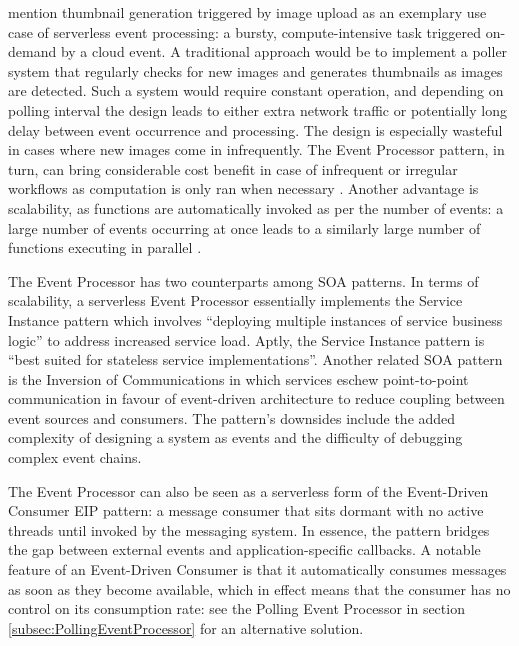 \textcite{baldini17currentTrends} mention thumbnail generation triggered by image upload as an exemplary use case of serverless event processing: a bursty, compute-intensive task triggered on-demand by a cloud event. A traditional approach would be to implement a poller system that regularly checks for new images and generates thumbnails as images are detected. Such a system would require constant operation, and depending on polling interval the design leads to either extra network traffic or potentially long delay between event occurrence and processing. The design is especially wasteful in cases where new images come in infrequently. The Event Processor pattern, in turn, can bring considerable cost benefit in case of infrequent or irregular workflows as computation is only ran when necessary \parencite{hong18securingviaserverlesspatterns}. Another advantage is scalability, as functions are automatically invoked as per the number of events: a large number of events occurring at once leads to a similarly large number of functions executing in parallel \parencite{hong18securingviaserverlesspatterns}.

The Event Processor has two counterparts among SOA patterns. In terms of scalability, a serverless Event Processor essentially implements the Service Instance pattern which involves ``deploying multiple instances of service business logic'' to address increased service load. Aptly, the Service Instance pattern is ``best suited for stateless service implementations''. Another related SOA pattern is the Inversion of Communications in which services eschew point-to-point communication in favour of event-driven architecture to reduce coupling between event sources and consumers. The pattern's downsides include the added complexity of designing a system as events and the difficulty of debugging complex event chains. \parencite{rotem12soa}

The Event Processor can also be seen as a serverless form of the Event-Driven Consumer EIP pattern: a message consumer that sits dormant with no active threads until invoked by the messaging system. In essence, the pattern bridges the gap between external events and application-specific callbacks. A notable feature of an Event-Driven Consumer is that it automatically consumes messages as soon as they become available, which in effect means that the consumer has no control on its consumption rate: see the Polling Event Processor in section \ref{subsec:PollingEventProcessor} for an alternative solution. \parencite{hohpe2004enterprise}

